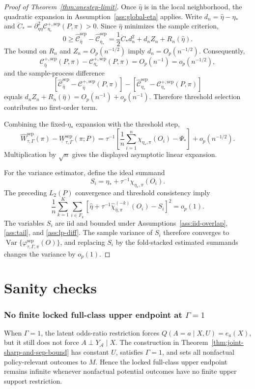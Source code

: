 \documentclass[11pt]{article}
\theoremstyle{definition}
\theoremstyle{plain}
\theoremstyle{remark}
\begin{document}
\begin{proof}[Proof of Theorem~\ref{thm:onestep-limit}]
Once \(\widehat\eta\) is in the local neighborhood, the quadratic expansion in
Assumption~\ref{ass:global-eta} applies.  Write
\(d_n=\widehat\eta-\eta_*\) and
\(\ddot C_*=\partial_{\eta\eta}^2
\mathcal C_{\eta_*}^{+,\mathrm{sep}}(P,\pi)>0\).  Since
\(\widehat\eta\) minimizes the sample criterion,
\[
0
\ge
\widehat{\mathcal C}_{\widehat\eta}^{\mathrm{sep}}
-
\widehat{\mathcal C}_{\eta_*}^{\mathrm{sep}}
=
\frac12\ddot C_* d_n^2+d_nZ_n+R_n(\widehat\eta).
\]
The bound on \(R_n\) and \(Z_n=O_p(n^{-1/2})\) imply
\(d_n=O_p(n^{-1/2})\).  Consequently,
\[
\mathcal C_{\widehat\eta}^{+,\mathrm{sep}}(P,\pi)
-
\mathcal C_{\eta_*}^{+,\mathrm{sep}}(P,\pi)
=O_p(n^{-1})=o_p(n^{-1/2}),
\]
and the sample-process difference
\[
\left[
\widehat{\mathcal C}_{\widehat\eta}^{\mathrm{sep}}
-\mathcal C_{\widehat\eta}^{+,\mathrm{sep}}(P,\pi)
\right]
-
\left[
\widehat{\mathcal C}_{\eta_*}^{\mathrm{sep}}
-\mathcal C_{\eta_*}^{+,\mathrm{sep}}(P,\pi)
\right]
\]
equals \(d_nZ_n+R_n(\widehat\eta)=O_p(n^{-1})+o_p(n^{-1})\).  Therefore
threshold selection contributes no first-order term.

Combining the fixed-\(\eta_*\) expansion with the threshold step,
\[
\widehat W_{\tau,\Gamma}^{\mathrm{sep}}(\pi)
-
\underline W_{\tau,\Gamma}^{\mathrm{sep}}(\pi;P)
=
\tau^{-1}
\left[
\frac1n\sum_{i=1}^n
\chi_{\eta_*,\pi}(O_i)
-
\Psi_*
\right]
+
o_p(n^{-1/2}).
\]
Multiplication by \(\sqrt n\) gives the displayed asymptotic linear expansion.

For the variance estimator, define the ideal summand
\[
S_i=\eta_*+\tau^{-1}\chi_{\eta_*,\pi}(O_i).
\]
The preceding \(L_2(P)\) convergence and threshold consistency imply
\[
\frac1n\sum_{k=1}^K\sum_{i\in F_k}
\left[
\widehat\eta+
\tau^{-1}\widehat\chi_{\widehat\eta,\pi}^{(-k)}(O_i)
-
S_i
\right]^2
=o_p(1).
\]
The variables \(S_i\) are iid and bounded under
Assumptions~\ref{ass:iid-overlap}, \ref{ass:tail}, and \ref{ass:lp-diff}.  The
sample variance of \(S_i\) therefore converges to
\(\operatorname{Var}\{\varphi_{\tau,\Gamma,\pi}^{\mathrm{sep}}(O)\}\), and
replacing \(S_i\) by the fold-stacked estimated summands changes the variance by
\(o_p(1)\).
\end{proof}

\section{Sanity checks}
\subsubsection*{No finite locked full-class upper endpoint at \(\Gamma=1\)}
When \(\Gamma=1\), the latent odds-ratio restriction forces
\(Q(A=a\mid X,U)=e_a(X)\), but it still does not force
\(A\perp Y_{\mathcal A}\mid X\).  The construction in
Theorem~\ref{thm:joint-sharp-and-sep-bound} has constant \(U\), satisfies
\(\Gamma=1\), and sets all nonfactual policy-relevant outcomes to \(M\).  Hence
the locked full-class upper endpoint remains infinite whenever nonfactual
potential outcomes have no finite upper support restriction.
\end{document}
